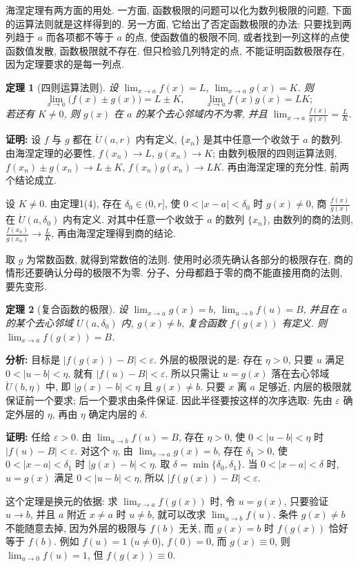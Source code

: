 \documentclass[UTF8,openany]{ctexbook}
\theoremstyle{chinesetextbook}
\newtheorem{theorem}{定理}[section]
\newenvironment{cnproof}{\par\indent\textbf{证明:} \ignorespaces}{\par}
\begin{document}
海涅定理有两方面的用处. 一方面, 函数极限的问题可以化为数列极限的问题, 下面的运算法则就是这样得到的. 另一方面, 它给出了否定函数极限的办法: 只要找到两列趋于 $a$ 而各项都不等于 $a$ 的点, 使函数值的极限不同, 或者找到一列这样的点使函数值发散, 函数极限就不存在. 但只检验几列特定的点, 不能证明函数极限存在, 因为定理要求的是每一列点.
\begin{theorem}[四则运算法则]
设 $\displaystyle\lim_{x\to a}f(x)=L$, $\displaystyle\lim_{x\to a}g(x)=K$. 则
\[
\lim_{x\to a}\bigl(f(x)\pm g(x)\bigr)=L\pm K,\qquad\lim_{x\to a}f(x)g(x)=LK;
\]
若还有 $K\ne0$, 则 $g(x)$ 在 $a$ 的某个去心邻域内不为零, 并且 $\displaystyle\lim_{x\to a}\frac{f(x)}{g(x)}=\frac LK$.
\end{theorem}
\begin{cnproof}
设 $f$ 与 $g$ 都在 $\mathring U(a,r)$ 内有定义, $\{x_n\}$ 是其中任意一个收敛于 $a$ 的数列. 由海涅定理的必要性, $f(x_n)\to L$, $g(x_n)\to K$; 由数列极限的四则运算法则, $f(x_n)\pm g(x_n)\to L\pm K$, $f(x_n)g(x_n)\to LK$. 再由海涅定理的充分性, 前两个结论成立.

设 $K\ne0$. 由定理1(4), 存在 $\delta_0\in(0,r]$, 使 $0<|x-a|<\delta_0$ 时 $g(x)\ne0$, 商 $\displaystyle\frac{f(x)}{g(x)}$ 在 $\mathring U(a,\delta_0)$ 内有定义. 对其中任意一个收敛于 $a$ 的数列 $\{x_n\}$, 由数列的商的法则, $\displaystyle\frac{f(x_n)}{g(x_n)}\to\frac LK$, 再由海涅定理得到商的结论.
\end{cnproof}
取 $g$ 为常数函数, 就得到常数倍的法则. 使用时必须先确认各部分的极限存在, 商的情形还要确认分母的极限不为零. 分子、分母都趋于零的商不能直接用商的法则, 要先变形.
\begin{theorem}[复合函数的极限]
设 $\displaystyle\lim_{x\to a}g(x)=b$, $\displaystyle\lim_{u\to b}f(u)=B$, 并且在 $a$ 的某个去心邻域 $\mathring U(a,\delta_0)$ 内, $g(x)\ne b$, 复合函数 $f(g(x))$ 有定义. 则 $\displaystyle\lim_{x\to a}f(g(x))=B$.
\end{theorem}
\par\indent\textbf{分析:} 目标是 $|f(g(x))-B|<\varepsilon$. 外层的极限说的是: 存在 $\eta>0$, 只要 $u$ 满足 $0<|u-b|<\eta$, 就有 $|f(u)-B|<\varepsilon$. 所以只需让 $u=g(x)$ 落在去心邻域 $\mathring U(b,\eta)$ 中, 即 $|g(x)-b|<\eta$ 且 $g(x)\ne b$. 只要 $x$ 离 $a$ 足够近, 内层的极限就保证前一个要求; 后一个要求由条件保证. 因此半径要按这样的次序选取: 先由 $\varepsilon$ 确定外层的 $\eta$, 再由 $\eta$ 确定内层的 $\delta$.
\begin{cnproof}
任给 $\varepsilon>0$. 由 $\displaystyle\lim_{u\to b}f(u)=B$, 存在 $\eta>0$, 使 $0<|u-b|<\eta$ 时 $|f(u)-B|<\varepsilon$. 对这个 $\eta$, 由 $\displaystyle\lim_{x\to a}g(x)=b$, 存在 $\delta_1>0$, 使 $0<|x-a|<\delta_1$ 时 $|g(x)-b|<\eta$. 取 $\delta=\min\{\delta_0,\delta_1\}$. 当 $0<|x-a|<\delta$ 时, $u=g(x)$ 满足 $0<|u-b|<\eta$, 所以 $|f(g(x))-B|<\varepsilon$.
\end{cnproof}
这个定理是换元的依据: 求 $\displaystyle\lim_{x\to a}f(g(x))$ 时, 令 $u=g(x)$, 只要验证 $u\to b$, 并且 $a$ 附近 $x\ne a$ 时 $u\ne b$, 就可以改求 $\displaystyle\lim_{u\to b}f(u)$. 条件 $g(x)\ne b$ 不能随意去掉, 因为外层的极限与 $f(b)$ 无关, 而 $g(x)=b$ 时 $f(g(x))$ 恰好等于 $f(b)$. 例如 $f(u)=1$ ($u\ne0$), $f(0)=0$, 而 $g(x)\equiv0$, 则 $\displaystyle\lim_{u\to0}f(u)=1$, 但 $f(g(x))\equiv0$.
\end{document}
